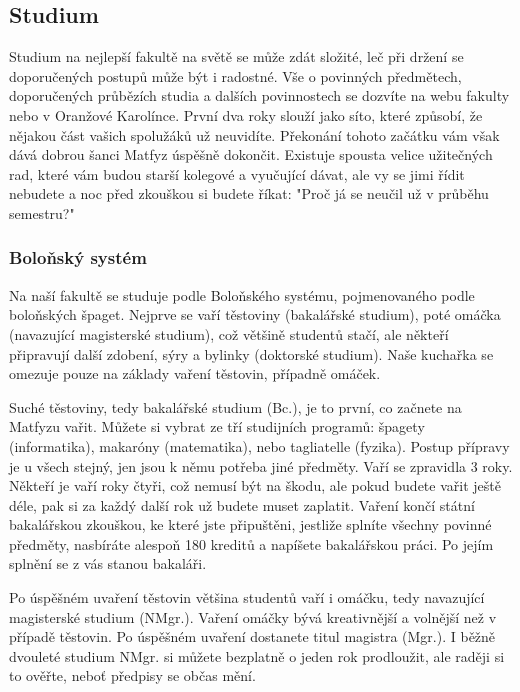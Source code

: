 \subsection{Studium}
Studium na nejlepší fakultě na světě se může zdát složité, leč při držení se
doporučených postupů může být i radostné. Vše o povinných předmětech,
doporučených průbězích studia a dalších povinnostech se dozvíte na webu fakulty
nebo v Oranžové Karolínce. První dva roky slouží jako síto, které způsobí, že
nějakou část vašich spolužáků už neuvidíte. Překonání tohoto začátku vám však
dává dobrou šanci Matfyz úspěšně dokončit. Existuje spousta velice užitečných
rad, které vám budou starší kolegové a vyučující dávat, ale vy se jimi řídit
nebudete a noc před zkouškou si budete říkat: "Proč já se neučil už v průběhu
semestru?"


\subsubsection{Boloňský systém}
Na naší fakultě se studuje podle Boloňského systému, pojmenovaného podle
boloňských špaget. Nejprve se vaří těstoviny (bakalářské studium), poté omáčka
(navazující magisterské studium), což většině studentů stačí, ale někteří
připravují další zdobení, sýry a bylinky (doktorské studium). Naše kuchařka se
omezuje pouze na základy vaření těstovin, případně omáček.

Suché těstoviny, tedy bakalářské studium (Bc.), je to první, co začnete na
Matfyzu vařit. Můžete si vybrat ze tří studijních programů: špagety
(informatika), makaróny (matematika), nebo tagliatelle (fyzika). Postup přípravy
je u všech stejný, jen jsou k němu potřeba jiné předměty. Vaří se zpravidla 3
roky. Někteří je vaří roky čtyři, což nemusí být na škodu, ale pokud budete
vařit ještě déle, pak si za každý další rok už budete muset zaplatit.
Vaření končí státní bakalářskou zkouškou, ke které jste připuštěni, jestliže
splníte všechny povinné předměty, nasbíráte alespoň 180 kreditů a napíšete
bakalářskou práci. Po jejím splnění se z vás stanou bakaláři.

Po úspěšném uvaření těstovin většina studentů vaří i omáčku, tedy navazující
magisterské studium (NMgr.). Vaření omáčky bývá kreativnější a volnější než v
případě těstovin. Po úspěšném uvaření dostanete titul magistra (Mgr.). I běžně
dvouleté studium NMgr. si můžete bezplatně o jeden rok prodloužit, ale raději si
to ověřte, neboť předpisy se občas mění.


